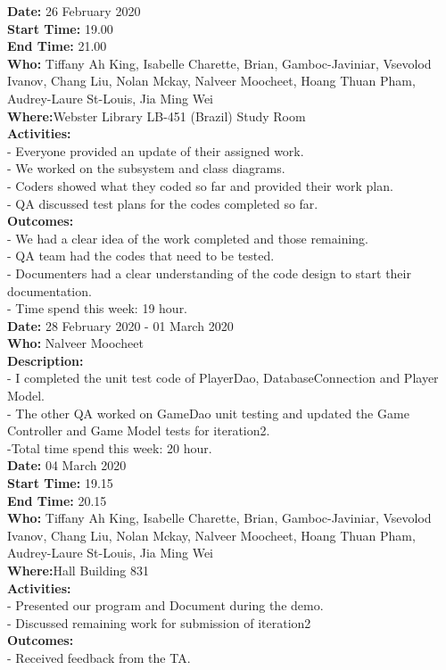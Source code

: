 \documentclass[12pt]{article}
\begin{document}
{\bf Date:} 26 February 2020 \\
{\bf Start Time:} 19.00 \\
{\bf End Time:} 21.00 \\
{\bf Who:} Tiffany Ah King, Isabelle Charette, Brian, Gamboc-Javiniar, Vsevolod Ivanov, Chang Liu, Nolan Mckay, Nalveer Moocheet, Hoang Thuan Pham, Audrey-Laure St-Louis, Jia Ming Wei \\
{\bf Where:}Webster Library LB-451 (Brazil) Study Room \\
{\bf Activities:}\\
- Everyone provided an update of their assigned work.\\
- We worked on the subsystem and class diagrams.\\
- Coders showed what they coded so far and provided their work plan.\\
- QA discussed test plans for the codes completed so far.\\
{\bf Outcomes:}\\
- We had a clear idea of the work completed and those remaining.\\
- QA team had the codes that need to be tested.\\
- Documenters had a clear understanding of the code design to start their documentation.\\
- Time spend this week: 19 hour.\\


{\bf Date:} 28 February 2020 - 01 March 2020\\ 
{\bf Who:} Nalveer Moocheet\\
{\bf Description:}\\
- I completed the unit test code of       PlayerDao,  DatabaseConnection and Player Model.\\
- The other QA worked on GameDao unit testing and updated the Game Controller and Game Model tests for iteration2. \\
-Total time spend this week: 20 hour.\\

{\bf Date:} 04 March 2020 \\
{\bf Start Time:} 19.15 \\
{\bf End Time:} 20.15 \\
{\bf Who:} Tiffany Ah King, Isabelle Charette, Brian, Gamboc-Javiniar, Vsevolod Ivanov, Chang Liu, Nolan Mckay, Nalveer Moocheet, Hoang Thuan Pham, Audrey-Laure St-Louis, Jia Ming Wei \\
{\bf Where:}Hall Building 831 \\
{\bf Activities:}\\
- Presented our program and Document during the demo.\\
- Discussed remaining work for submission of iteration2\\
{\bf Outcomes:}\\
- Received feedback from the TA.\\
\end{document}
